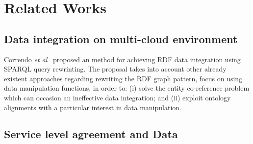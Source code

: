 \section{Related Works}\label{sec:rw}

\subsection{Data integration on multi-cloud environment}
Correndo \textit{et al}~\cite{075} proposed an method for achieving RDF data integration
using SPARQL query rewrinting. 
The proposal takes into account other already existent approaches regarding rewriting 
the RDF graph pattern, focus on using data manipulation functions, in order to: (i) solve 
the entity co-reference problem which can occasion an ineffective data integration; 
and (ii) exploit ontology alignments with a particular interest in data manipulation. 

\subsection{Service level agreement and Data}
